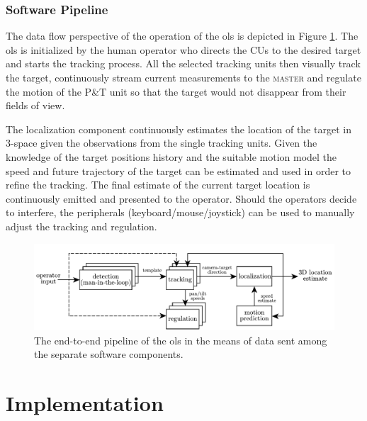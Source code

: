 \subsection{Software Pipeline} \label{txt:sw_pipeline}

The data flow perspective of the operation of the \gls{ols} is depicted in Figure \ref{fig:pipeline}. The \gls{ols} is initialized by the human operator who directs the CUs to the desired target and starts the tracking process. All the selected tracking units then visually track the target, continuously stream current measurements to the \textsc{master} and regulate the motion of the P\&T unit so that the target would not disappear from their fields of view.

The localization component continuously estimates the location of the target in 3-space given the observations from the single tracking units. Given the knowledge of the target positions history and the suitable motion model the speed and future trajectory of the target can be estimated and used in order to refine the tracking. The final estimate of the current target location is continuously emitted and presented to the operator. Should the operators decide to interfere, the peripherals (keyboard/mouse/joystick) can be used to manually adjust the tracking and regulation.

\begin{figure}[htb]
	\centering
	\includegraphics[width=0.95\linewidth]{fig/pipeline.pdf}
	\caption{The end-to-end pipeline of the \gls{ols} in the means of data sent among the separate software components.}
	\label{fig:pipeline}
\end{figure}


\chapter{Implementation} \label{txt:implementation}

